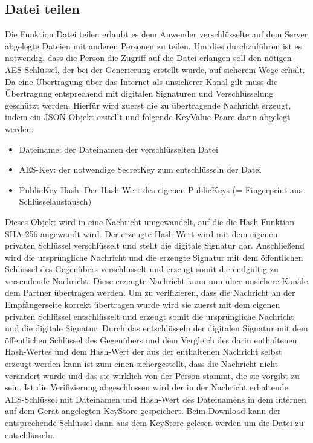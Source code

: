 \documentclass[10pt, a4paper,headsepline]{scrreprt}
\begin{document}
\subsection{Datei teilen}
Die Funktion Datei teilen erlaubt es dem Anwender verschlüsselte auf dem Server abgelegte Dateien mit anderen Personen zu teilen. Um dies durchzuführen ist es notwendig, dass die Person die Zugriff auf die Datei erlangen soll den nötigen AES-Schlüssel, der bei der Generierung erstellt wurde, auf sicherem Wege erhält. Da eine Übertragung über das Internet als unsicherer Kanal gilt muss die Übertragung entsprechend mit digitalen Signaturen und Verschlüsselung geschützt werden. Hierfür wird zuerst die zu übertragende Nachricht erzeugt, indem ein JSON-Objekt erstellt und folgende KeyValue-Paare darin abgelegt werden:
\begin{itemize}
\item Dateiname: der Dateinamen der verschlüsselten Datei
\item AES-Key: der notwendige SecretKey zum entschlüsseln der Datei
\item PublicKey-Hash: Der Hash-Wert des eigenen PublicKeys (= Fingerprint aus Schlüsselaustausch)
\end{itemize}
Dieses Objekt wird in eine Nachricht umgewandelt, auf die die Hash-Funktion SHA-256 angewandt wird. Der erzeugte Hash-Wert wird mit dem eigenen privaten Schlüssel verschlüsselt und stellt die digitale Signatur dar. Anschließend wird die ursprüngliche Nachricht und die erzeugte Signatur mit dem öffentlichen Schlüssel des Gegenübers verschlüsselt und erzeugt somit die endgültig zu versendende Nachricht.
Diese erzeugte Nachricht kann nun über unsichere Kanäle dem Partner übertragen werden. Um zu verifizieren, dass die Nachricht an der Empfängerseite korrekt übertragen wurde wird sie zuerst mit dem eigenen privaten Schlüssel entschlüsselt und erzeugt somit die ursprüngliche Nachricht und die digitale Signatur. Durch das entschlüsseln der digitalen Signatur mit dem öffentlichen Schlüssel des Gegenübers und dem Vergleich des darin enthaltenen Hash-Wertes und dem Hash-Wert der aus der enthaltenen Nachricht selbst erzeugt werden kann ist zum einen sichergestellt, dass die Nachricht nicht verändert wurde und das sie wirklich von der Person stammt, die sie vorgibt zu sein. Ist die Verifizierung abgeschlossen wird der in der Nachricht erhaltende AES-Schlüssel mit Dateinamen und Hash-Wert des Dateinamens in dem internen auf dem Gerät angelegten KeyStore gespeichert. Beim Download kann der entsprechende Schlüssel dann aus dem KeyStore gelesen werden um die Datei zu entschlüsseln.
\end{document}
